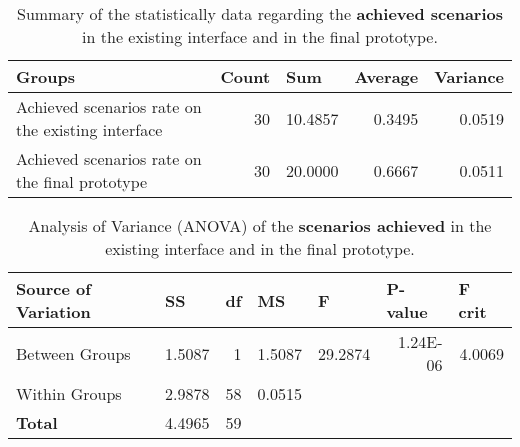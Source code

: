 \begin{table}[tb]
  \caption{Summary of the statistically data regarding the \textbf{achieved scenarios} in the existing interface and in the final prototype.}
	\label{tab:statistical_summary_achieved}
  \begin{tabular}{@{}m{5cm}rrrr@{}}
  \toprule
  \textbf{Groups}                                   & \multicolumn{1}{l}{\textbf{Count}} & \multicolumn{1}{l}{\textbf{Sum}} & \multicolumn{1}{l}{\textbf{Average}} & \multicolumn{1}{l}{\textbf{Variance}} \\ \midrule
  Achieved scenarios rate on the existing interface & 30                        & 10.4857                 & 0.3495                      & 0.0519                       \\
  Achieved scenarios rate on the final prototype    & 30                        & 20.0000                 & 0.6667                      & 0.0511                       \\ \bottomrule
  \end{tabular}
  \end{table}

\begin{table}[tb]
  \caption{Analysis of Variance (ANOVA) of the \textbf{scenarios achieved} in the existing interface and in the final prototype.}
	\label{tab:anova_achieved}
  \begin{tabular}{@{}lllllll@{}}
  \toprule
  \textbf{Source of Variation} & \textbf{SS}                & \textbf{df}            & \textbf{MS}                & \textbf{F}                  & \textbf{P-value}             & \textbf{F crit}            \\ \midrule
  Between Groups               & \multicolumn{1}{r}{1.5087} & \multicolumn{1}{r}{1}  & \multicolumn{1}{r}{1.5087} & \multicolumn{1}{r}{29.2874} & \multicolumn{1}{r}{1.24E-06} & \multicolumn{1}{r}{4.0069} \\
  Within Groups                & \multicolumn{1}{r}{2.9878} & \multicolumn{1}{r}{58} & \multicolumn{1}{r}{0.0515} &                             &                              &                            \\ \midrule
  \textbf{Total}               & 4.4965                     & 59                     &                            &                             &                              &                            \\ \bottomrule
  \end{tabular}
  \end{table}

